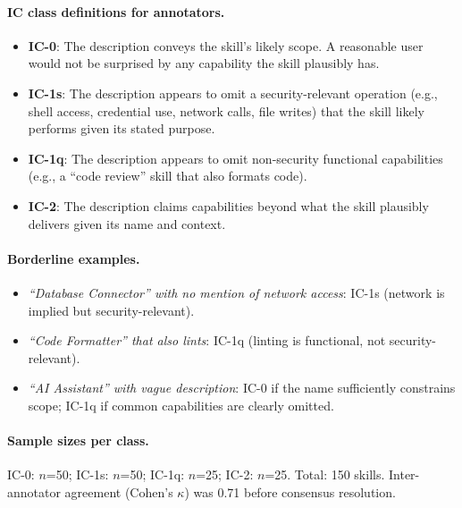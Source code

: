 \documentclass[11pt]{article}
\begin{document}
\paragraph{IC class definitions for annotators.}
\begin{itemize}[nosep]
  \item \textbf{IC-0}: The description conveys the skill's
    likely scope. A reasonable user would not be surprised
    by any capability the skill plausibly has.
  \item \textbf{IC-1s}: The description appears to omit
    a security-relevant operation (e.g., shell access,
    credential use, network calls, file writes) that
    the skill likely performs given its stated purpose.
  \item \textbf{IC-1q}: The description appears to omit
    non-security functional capabilities (e.g., a
    ``code review'' skill that also formats code).
  \item \textbf{IC-2}: The description claims capabilities
    beyond what the skill plausibly delivers given
    its name and context.
\end{itemize}

\paragraph{Borderline examples.}
\begin{itemize}[nosep]
  \item \emph{``Database Connector'' with no mention of
    network access}: IC-1s (network is implied but
    security-relevant).
  \item \emph{``Code Formatter'' that also lints}:
    IC-1q (linting is functional, not security-relevant).
  \item \emph{``AI Assistant'' with vague description}:
    IC-0 if the name sufficiently constrains scope;
    IC-1q if common capabilities are clearly omitted.
\end{itemize}

\paragraph{Sample sizes per class.}
IC-0: $n$=50; IC-1s: $n$=50; IC-1q: $n$=25; IC-2: $n$=25.
Total: 150 skills.
Inter-annotator agreement (Cohen's $\kappa$) was 0.71
before consensus resolution.
\end{document}
